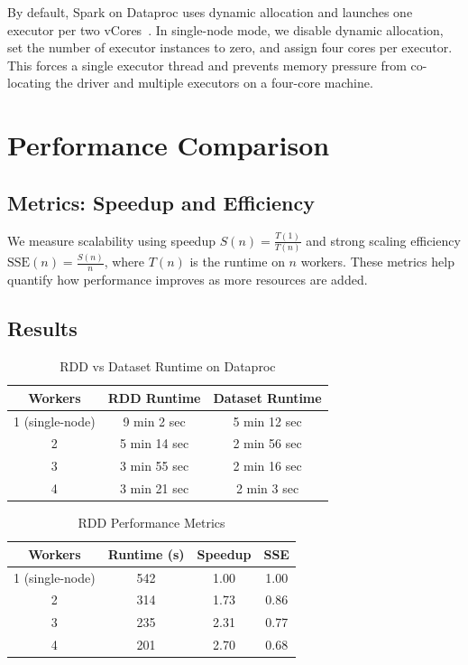 \documentclass[sigconf,nonacm]{acmart}
\begin{document}
By default, Spark on Dataproc uses dynamic allocation and launches one executor per two vCores~\cite{dataproc-dynalloc}. In single-node mode, we disable dynamic allocation, set the number of executor instances to zero, and assign four cores per executor. This forces a single executor thread and prevents memory pressure from co-locating the driver and multiple executors on a four-core machine.

\section{Performance Comparison}
\subsection{Metrics: Speedup and Efficiency}
We measure scalability using speedup \( S(n) = \frac{T(1)}{T(n)} \) and strong scaling efficiency \( \text{SSE}(n) = \frac{S(n)}{n} \), where \( T(n) \) is the runtime on \( n \) workers. These metrics help quantify how performance improves as more resources are added.


\subsection{Results}

\begin{table}[h]
\centering
\caption{RDD vs Dataset Runtime on Dataproc}
\label{tab:rdd-vs-dataset}
\begin{tabular}{@{}ccc@{}}
\toprule
\textbf{Workers} & \textbf{RDD Runtime} & \textbf{Dataset Runtime} \\
\midrule
1 (single-node) & 9 min 2 sec   & 5 min 12 sec \\
2               & 5 min 14 sec  & 2 min 56 sec \\
3               & 3 min 55 sec  & 2 min 16 sec \\
4               & 3 min 21 sec  & 2 min 3 sec  \\
\bottomrule
\end{tabular}
\end{table}

\begin{table}[h]
  \centering
  \caption{RDD Performance Metrics}
  \begin{tabular}{cccc}
    \toprule
    \textbf{Workers} & \textbf{Runtime (s)} & \textbf{Speedup} & \textbf{SSE} \\
    \midrule
    1 (single-node) & 542 & 1.00 & 1.00 \\
    2 & 314 & 1.73 & 0.86 \\
    3 & 235 & 2.31 & 0.77 \\
    4 & 201 & 2.70 & 0.68 \\
    \bottomrule
  \end{tabular}
\end{table}
\end{document}
